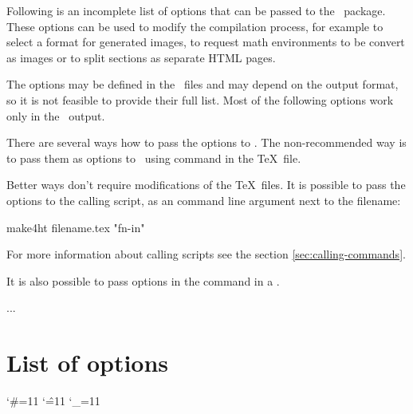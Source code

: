 


Following is an incomplete list of options that can be passed to the \fourhtsty\ package.
These options can be used to modify the compilation process, for example to
select a  format for generated images, to request math environments
to be convert as images or to split sections as separate HTML pages. 

The options may be defined in the \fourhtfile\ files and may depend on the
output format, so it is not feasible to provide their full list. Most of the
following options work only in the \HTML\ output.

There are several ways how to pass the options to \texfourht. The
non-recommended way is to pass them as options to \fourhtsty\ using
\texcommand{\usepackage} command in the \TeX\ file. 

Better ways don't require modifications of the \TeX\ files.
It is possible to pass the options to the calling script, as an command line
argument next to the filename:

\begin{shellcommand}
make4ht filename.tex "fn-in"
\end{shellcommand}

For more information about calling scripts see the section \ref{sec:calling-commands}.

It is also possible to pass options in the \texcommand{\Preamble} command in a \cfgfile.

\begin{texsource}
...

\EndPreamble
\end{texsource}



\section{List of options}

\begingroup
\catcode`\#=11 \catcode`\^=11 \catcode`\_=11


